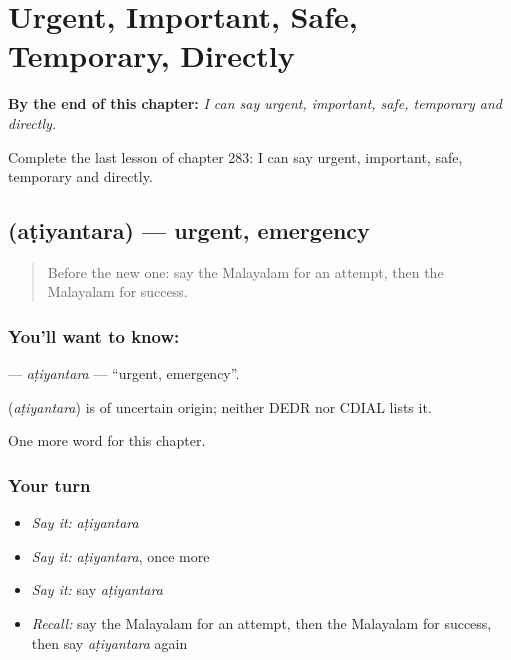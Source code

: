 
\chapter{Urgent, Important, Safe, Temporary, Directly}
\label{ch:ml-urgent-important-safe-temporary-directly}

\begin{chapteropening}
\textbf{By the end of this chapter:} \emph{I can say urgent, important, safe, temporary and directly.}

Complete the last lesson of chapter 283: I can say urgent, important, safe, temporary and directly.
\end{chapteropening}

\section[\texorpdfstring{\ml{അടിയന്തര} (aṭiyantara)}{അടിയന്തര (aṭiyantara)}]{ (aṭiyantara) — urgent, emergency}

\label{lesson:ML-C283-atiyantara}



\begin{quote}
Before the new one: say the Malayalam for an attempt, then the Malayalam for success.
\end{quote}

\subsection*{You'll want to know: }
\textbf{} — \emph{aṭiyantara} — \textquotedblleft{}urgent, emergency\textquotedblright{}.

\begin{cousinweb}
\textbf{} (\emph{aṭiyantara}) is of uncertain origin; neither DEDR nor CDIAL lists it.
\end{cousinweb}

\begin{grammarlens}[title={What you've built}]
One more word for this chapter.
\end{grammarlens}

\subsection*{Your turn}
\begin{itemize}
\raggedright
  \item \emph{Say it:} \emph{aṭiyantara}
  \item \emph{Say it:} \emph{aṭiyantara}, once more
  \item \emph{Say it:} say \emph{aṭiyantara}
  \item \emph{Recall:} say the Malayalam for an attempt, then the Malayalam for success, then say \emph{aṭiyantara} again
\end{itemize}

